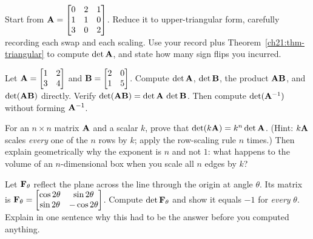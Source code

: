 \begin{exercise}
\label{ch21:ex-rowops}
Start from $\mathbf{A} = \begin{bmatrix} 0 & 2 & 1 \\ 1 & 1 & 0 \\ 3 & 0 & 2 \end{bmatrix}$.
Reduce it to upper-triangular form, carefully recording each swap and each scaling.
Use your record plus Theorem~\ref{ch21:thm-triangular} to compute $\det\mathbf{A}$, and
state how many sign flips you incurred.
\end{exercise}

\begin{exercise}
\label{ch21:ex-product-hand}
Let $\mathbf{A} = \begin{bmatrix} 1 & 2 \\ 3 & 4 \end{bmatrix}$ and
$\mathbf{B} = \begin{bmatrix} 2 & 0 \\ 1 & 5 \end{bmatrix}$. Compute $\det\mathbf{A}$,
$\det\mathbf{B}$, the product $\mathbf{A}\mathbf{B}$, and $\det(\mathbf{A}\mathbf{B})$ directly.
Verify $\det(\mathbf{A}\mathbf{B}) = \det\mathbf{A}\,\det\mathbf{B}$. Then compute
$\det(\mathbf{A}^{-1})$ without forming $\mathbf{A}^{-1}$.
\end{exercise}

\begin{exercise}
\label{ch21:ex-scaling}
For an $n\times n$ matrix $\mathbf{A}$ and a scalar $k$, prove that
$\det(k\mathbf{A}) = k^n\det\mathbf{A}$. (Hint: $k\mathbf{A}$ scales \emph{every} one of the
$n$ rows by $k$; apply the row-scaling rule $n$ times.) Then explain geometrically
why the exponent is $n$ and not $1$: what happens to the volume of an
$n$-dimensional box when you scale all $n$ edges by $k$?
\end{exercise}

\begin{exercise}
\label{ch21:ex-reflection-line}
Let $\mathbf{F}_\theta$ reflect the plane across the line through the origin at angle
$\theta$. Its matrix is
$\mathbf{F}_\theta = \begin{bmatrix} \cos 2\theta & \sin 2\theta \\ \sin 2\theta & -\cos 2\theta \end{bmatrix}$.
Compute $\det\mathbf{F}_\theta$ and show it equals $-1$ for \emph{every} $\theta$.
Explain in one sentence why this had to be the answer before you computed
anything.
\end{exercise}

